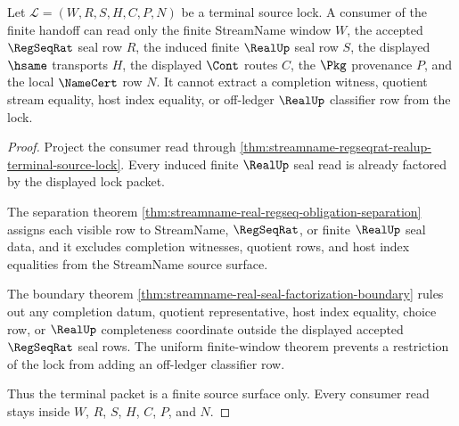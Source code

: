 \begin{theorem}
\label{thm:streamname-regseqrat-realup-terminal-nonescape}
Let $\mathcal{L}=(W,R,S,H,C,P,N)$ be a terminal source lock. A consumer of the
finite handoff can read only the finite StreamName window $W$, the accepted
$\RegSeqRat$ seal row $R$, the induced finite $\RealUp$ seal row $S$, the
displayed $\hsame$ transports $H$, the displayed $\Cont$ routes $C$, the
$\Pkg$ provenance $P$, and the local $\NameCert$ row $N$. It cannot extract a
completion witness, quotient stream equality, host index equality, or
off-ledger $\RealUp$ classifier row from the lock.
\end{theorem}
\begin{proof}
Project the consumer read through
\autoref{thm:streamname-regseqrat-realup-terminal-source-lock}. Every induced
finite $\RealUp$ seal read is already factored by the displayed lock packet.

The separation theorem
\autoref{thm:streamname-real-regseq-obligation-separation} assigns each
visible row to StreamName, $\RegSeqRat$, or finite $\RealUp$ seal data, and it
excludes completion witnesses, quotient rows, and host index equalities from
the StreamName source surface.

The boundary theorem
\autoref{thm:streamname-real-seal-factorization-boundary} rules out any
completion datum, quotient representative, host index equality, choice row, or
$\RealUp$ completeness coordinate outside the displayed accepted
$\RegSeqRat$ seal rows. The uniform finite-window theorem prevents a
restriction of the lock from adding an off-ledger classifier row.

Thus the terminal packet is a finite source surface only. Every consumer read
stays inside $W$, $R$, $S$, $H$, $C$, $P$, and $N$.
\end{proof}

